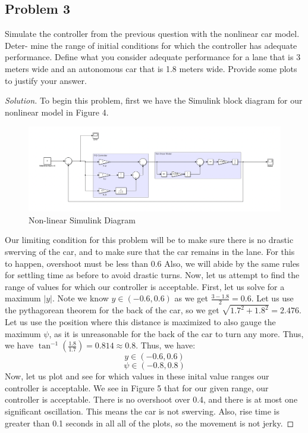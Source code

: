 \documentclass{article}
\newcommand{\atan}{\tan^{-1}}
\begin{document}
\subsection*{Problem 3}
Simulate the controller from the previous question with the nonlinear car model. Deter-
mine the range of initial conditions for which the controller has adequate performance.
Define what you consider adequate performance for a lane that is 3 meters wide and an
autonomous car that is 1.8 meters wide. Provide some plots to justify your answer.
\begin{proof}[Solution]
To begin this problem, first we have the Simulink block diagram for our nonlinear model in Figure 4.
\begin{figure}[h!]
    \includegraphics[width=\linewidth]{Q3Model.png}
    \caption{Non-linear Simulink Diagram}
\end{figure}
Our limiting condition for this problem will be to make sure there is no drastic swerving of the car, and to make sure that the car remains in the lane. For this to happen, overshoot must be less than 0.6
Also, we will abide by the same rules for settling time as before to avoid drastic turns. 
\newline
Now, let us attempt to find the range of values for which our controller is acceptable. 
First, let us solve for a maximum $|y|$. Note we know $y \in (-0.6,0.6)$ as we get $\frac{3-1.8}{2}=0.6$.
Let us use the pythagorean theorem for the back of the car, so we get $\sqrt{1.7^2+1.8^2}=2.476$. Let us use the position where this distance is maximized to also 
gauge the maximum $\psi$, as it is unreasonable for the back of the car to turn any more. Thus, we have 
$\atan\left(\frac{1.8}{1.7}\right)=0.814\approx 0.8$. Thus, we have:
 \[y \in (-0.6, 0.6)\]  
 \[\psi \in (-0.8, 0.8)
 \]
 Now, let us plot and see for which values in these inital value ranges our controller is acceptable. We see in Figure 5 that 
 for our given range, our controller is acceptable. There is no overshoot over 0.4, and there is at most one significant oscillation. This means the car is not swerving.
 Also, rise time is greater than 0.1 seconds in all all of the plots, so the movement is not jerky.

\end{proof}
\end{document}
